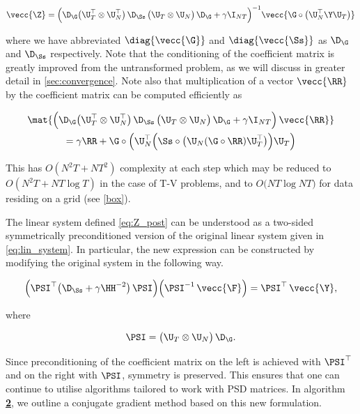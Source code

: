 \begin{equation}
    \label{eq:Z_post}
    \vecc{\Z} = \Big( \D_{\G} \big( \U_T^\top \otimes \U_N^\top \big)\, \D_{\Ss} \, \big(\U_T \otimes \U_N \big) \,\D_{\G} + \gamma \I_{NT} \Big)^{-1} \vecc{\G \circ \big(\U_N^\top \Y \U_T\big)}
\end{equation}

\noindent where we have abbreviated $\diag{\vecc{\G}}$ and $\diag{\vecc{\Ss}}$ as $\D_{\G}$ and $\D_{\Ss}$ respectively. Note that the conditioning of the coefficient matrix is greatly improved from the untransformed problem, as we will discuss in greater detail in \cref{sec:convergence}. Note also that multiplication of a vector $\vecc{\RR}$ by the coefficient matrix can be computed efficiently as 

\begin{multline}
    \mat{\Big( \D_{\G} \big( \U_T^\top \otimes \U_N^\top \big)\, \D_{\Ss} \, \big(\U_T \otimes \U_N \big) \,\D_{\G} + \gamma \I_{NT} \Big) \, \vecc{\RR}} \\ = \gamma \RR + \G \circ \left(\U_N^\top \Big( \Ss \circ \big(\U_N (\G \circ \RR) \U_T^\top \big) \Big) \U_T\right) 
\end{multline}



This has $O(N^2T + NT^2)$ complexity at each step which may be  reduced to $O(N^2T + NT \log T)$ in the case of T-V problems, and to $O\big(NT \log NT \big)$ for data residing on a grid (see \cref{box}). 

The linear system defined \cref{eq:Z_post} can be understood as a two-sided symmetrically preconditioned version of the original linear system given in \cref{eq:lin_system}. In particular, the new expression can be constructed by modifying the original system in the following way.

\begin{equation}
    \Big(\PSI^\top  \big(\D_{\Ss} + \gamma  \HH^{-2}\big) \, \PSI  \Big) \Big(\PSI^{-1}\, \vecc{ \F } \Big) = \PSI^\top \, \vecc{\Y},
\end{equation}

\noindent where

\begin{equation}
    \PSI =   \big(\U_T \otimes \U_N\big) \, \D_{\G}.
\end{equation}

Since preconditioning of the coefficient matrix on the left is achieved with $\PSI^\top$ and on the right with $\PSI$, symmetry is preserved. This ensures that one can continue to utilise algorithms tailored to work with PSD matrices. In algorithm \hyperlink{al:CGM}{\textbf{2}}, we outline a conjugate gradient method based on this new formulation. 

